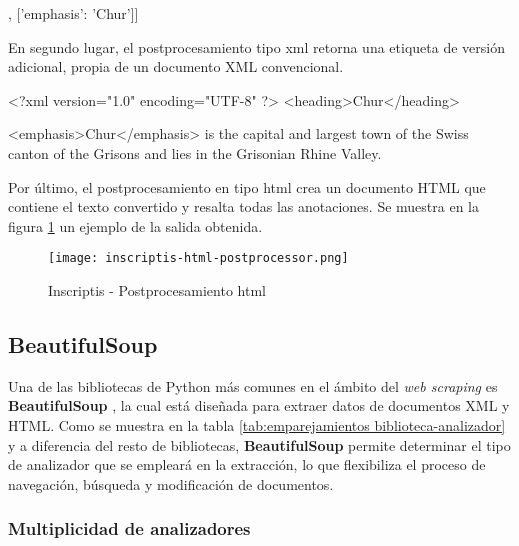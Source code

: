 \begin{Schunk}
  \begin{Soutput}
    [['heading', 'Chur'],
      ['emphasis': 'Chur']]
  \end{Soutput}
\end{Schunk}

En segundo lugar, el postprocesamiento tipo xml retorna una etiqueta de versión adicional, propia de un
documento XML convencional.

\begin{Schunk}
  \begin{Soutput}
    <?xml version="1.0" encoding="UTF-8" ?>
    <heading>Chur</heading>

    <emphasis>Chur</emphasis> is the capital and largest town of the 
    Swiss canton of the Grisons and lies in the Grisonian Rhine Valley.
  \end{Soutput}
\end{Schunk}

Por último, el postprocesamiento en tipo html crea un documento HTML que contiene el texto convertido y 
resalta todas las anotaciones. Se muestra en la figura \ref{img: inscriptis - postprocesamiento html} un 
ejemplo de la salida obtenida.

\begin{figure}[tphb]
  \centering
  \texttt{[image: inscriptis-html-postprocessor.png]}
  \caption{Inscriptis - Postprocesamiento html}
  \label{img: inscriptis - postprocesamiento html}
\end{figure}

\subsection{BeautifulSoup}
\label{subsec:beautifulsoup}

Una de las bibliotecas de Python más comunes en el ámbito del \emph{web scraping} es \textbf{BeautifulSoup}
\cite{beautifulsoup}, la cual está diseñada para extraer datos de documentos XML y HTML. Como se muestra
en la tabla \ref{tab:emparejamientos biblioteca-analizador} y a diferencia del resto de bibliotecas,
\textbf{BeautifulSoup} permite determinar el tipo de analizador que se empleará en la extracción, lo que
flexibiliza el proceso de navegación, búsqueda y modificación de documentos.

\subsubsection{Multiplicidad de analizadores}
\label{subsubsec:multiplicidad de analizadores}

